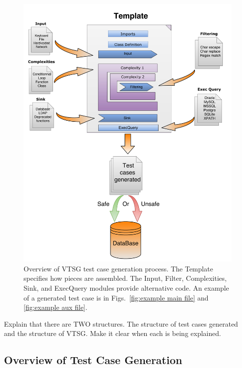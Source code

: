 \documentclass[12pt]{article}
\begin{document}
\begin{figure}[htbp]
  \includegraphics[width=1\linewidth]{fig_VTSG_overview.png}
  \caption{Overview of VTSG test case generation process. The Template
  specifies how pieces are assembled. The Input, Filter, Complexities,
  Sink, and ExecQuery modules provide alternative code.  
  An example of
  a generated test case is in 
  Figs.~\ref{fig:example main file} and 
  \ref{fig:example aux file}.}
  \label{fig:VTS operation overview}
\end{figure}

{\large Explain that there are TWO structures. The structure of test
  cases generated and the structure of VTSG.  Make it clear when each
  is being explained.}

\subsection{Overview of Test Case Generation}
\end{document}
